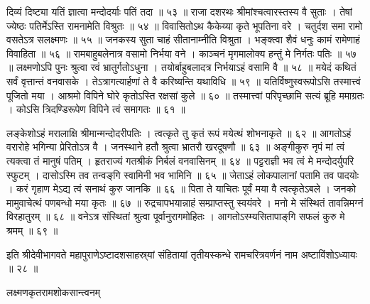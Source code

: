 दिव्यं दिष्ट्या यतिं ज्ञात्वा मन्दोदर्याः पतिं तदा ॥ ५३ ॥
राजा दशरथः श्रीमांश्चत्वारस्तस्य वै सुताः ।
तेषां ज्येष्ठः पतिर्मेऽस्ति रामनामेति विश्रुतः ॥ ५४ ॥
विवासितोऽथ कैकेय्या कृते भूपतिना वरे ।
चतुर्दश समा रामो वसतेऽत्र सलक्ष्मणः ॥ ५५ ॥
जनकस्य सुता चाहं सीतानाम्नीति विश्रुता ।
भङ्क्त्वा शैवं धनुः कामं रामेणाहं विवाहिता ॥ ५६ ॥
रामबाहुबलेनात्र वसामो निर्भया वने ।
काञ्चनं मृगमालोक्य हन्तुं मे निर्गतः पतिः ॥ ५७ ॥
लक्ष्मणोऽपि पुनः श्रुत्वा रवं भ्रातुर्गतोऽधुना ।
तयोर्बाहुबलादत्र निर्भयाऽहं वसामि वै ॥ ५८ ॥
मयेदं कथितं सर्वं वृत्तान्तं वनवासके ।
तेऽत्रागत्यार्हणां ते वै करिष्यन्ति यथाविधि ॥ ५९ ॥
यतिर्विष्णुस्वरूपोऽसि तस्मात्त्वं पूजितो मया ।
आश्रमो विपिने घोरे कृतोऽस्ति रक्षसां कुले ॥ ६० ॥
तस्मात्त्वां परिपृच्छामि सत्यं ब्रूहि ममाग्रतः ।
कोऽसि त्रिदण्डिरूपेण विपिने त्वं समागतः ॥ ६१ ॥

लङ्केशोऽहं मरालाक्षि श्रीमान्मन्दोदरीपतिः ।
त्वत्कृते तु कृतं रूपं मयेत्थं शोभनाकृते ॥ ६२ ॥
आगतोऽहं वरारोहे भगिन्या प्रेरितोऽत्र वै ।
जनस्थाने हतौ श्रुत्वा भ्रातरौ खरदूषणौ ॥ ६३ ॥
अङ्गीकुरु नृपं मां त्वं त्यक्त्वा तं मानुषं पतिम् ।
हृतराज्यं गतश्रीकं निर्बलं वनवासिनम् ॥ ६४ ॥
पट्टराज्ञी भव त्वं मे मन्दोदर्युपरि स्फुटम् ।
दासोऽस्मि तव तन्वङ्‌गि स्वामिनी भव भामिनि ॥ ६५ ॥
जेताऽहं लोकपालानां पतामि तव पादयोः ।
करं गृहाण मेऽद्य त्वं सनाथं कुरु जानकि ॥ ६६ ॥
पिता ते याचितः पूर्वं मया वै त्वत्कृतेऽबले ।
जनको मामुवाचेत्थं पणबन्धो मया कृतः ॥ ६७ ॥
रुद्रचापभयान्नाहं सम्प्राप्तस्तु स्वयंवरे ।
मनो मे संस्थितं तावन्निमग्नं विरहातुरम् ॥ ६८ ॥
वनेऽत्र संस्थितां श्रुत्वा पूर्वानुरागमोहितः ।
आगतोऽस्म्यसितापाङ्‌गि सफलं कुरु मे श्रमम् ॥ ६९ ॥


इति श्रीदेवीभागवते महापुराणेऽष्टादशसाहस्र्यां संहितायां तृतीयस्कन्धे रामचरित्रवर्णनं नाम अष्टाविंशोऽध्यायः ॥ २८ ॥


लक्ष्मणकृतरामशोकसान्त्वनम्

